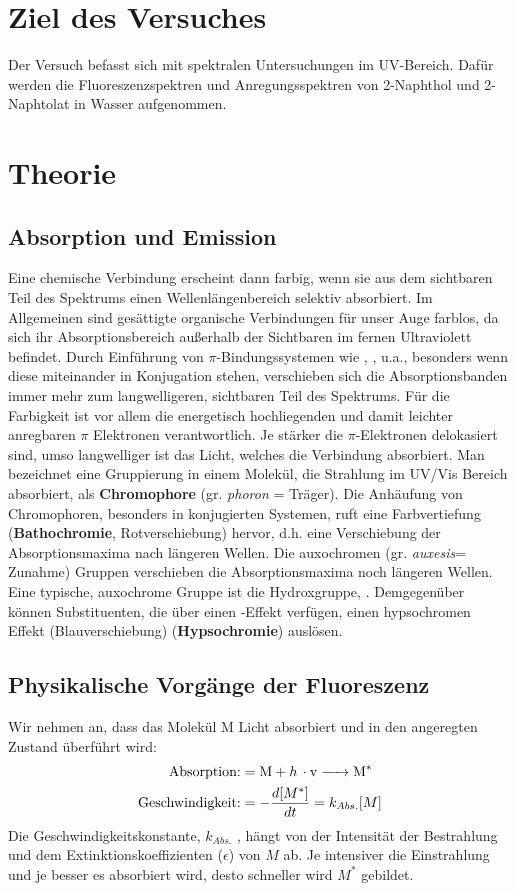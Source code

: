 \documentclass[12pt]{article}
\begin{document}
\section{Ziel des Versuches}
Der Versuch befasst sich mit spektralen Untersuchungen im UV-Bereich. Dafür werden die Fluoreszenzspektren und Anregungsspektren von 2-Naphthol und 2-Naphtolat in Wasser aufgenommen.
\section {Theorie}
\subsection{Absorption und Emission\supercite{og}}
 Eine chemische Verbindung erscheint dann farbig, wenn sie aus dem sichtbaren Teil des Spektrums einen Wellenlängenbereich selektiv absorbiert.
Im Allgemeinen sind gesättigte organische Verbindungen für unser Auge farblos, da sich ihr Absorptionsbereich außerhalb der Sichtbaren im fernen Ultraviolett
befindet. Durch Einführung von $\pi$-Bindungssystemen wie , ,  u.a., besonders wenn diese miteinander in Konjugation stehen, verschieben sich
die Absorptionsbanden immer mehr zum langwelligeren, sichtbaren Teil des Spektrums.
Für die Farbigkeit ist vor allem die energetisch hochliegenden und damit leichter anregbaren $\pi$ Elektronen verantwortlich.
Je stärker die $\pi$-Elektronen delokasiert sind, umso langwelliger ist das Licht, welches die Verbindung absorbiert.
Man bezeichnet eine Gruppierung in einem Molekül, die Strahlung im UV/Vis Bereich absorbiert, als \textbf{Chromophore} (gr. \textit{phoron} = Träger). Die Anhäufung von Chromophoren,
besonders in konjugierten Systemen, ruft eine Farbvertiefung (\textbf{Bathochromie}, Rotverschiebung) hervor, d.h. eine Verschiebung der Absorptionsmaxima nach längeren Wellen.
Die auxochromen (gr. \textit{auxesis}= Zunahme) Gruppen verschieben die Absorptionsmaxima noch längeren Wellen. Eine typische, auxochrome Gruppe ist die Hydroxgruppe, .
Demgegenüber können Substituenten, die über einen -Effekt verfügen, einen hypsochromen Effekt (Blauverschiebung) (\textbf{Hypsochromie}) auslösen.

\subsection{Physikalische Vorgänge der Fluoreszenz\supercite{harris}}
Wir nehmen an, dass das Molekül M Licht absorbiert und in den angeregten Zustand 
überführt wird:
\begin{align*}
 \text{Absorption:} &= \ce{M + h \cdot v -> M^*}\\
 \text{Geschwindigkeit:} &= - \frac{d[M^*]}{dt} = k _{Abs.} [M]
\end{align*}
Die Geschwindigkeitskonstante, $k_{Abs.}$ , hängt von der Intensität der Bestrahlung und
dem Extinktionskoeffizienten ($\epsilon$) von $M$ ab. Je intensiver die Einstrahlung und je besser es
absorbiert wird, desto schneller wird $M^*$ gebildet.
\end{document}
